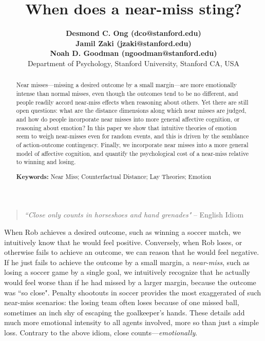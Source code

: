 \documentclass[10pt,letterpaper]{article}
\title{ When does a near-miss sting? }
\author{{\large \bf Desmond C. Ong (dco@stanford.edu)} \\
{\large \bf Jamil Zaki (jzaki@stanford.edu)} \\
{\large \bf Noah D. Goodman (ngoodman@stanford.edu)} \\
  Department of Psychology, Stanford University, Stanford CA, USA 
}
\begin{document}
\maketitle

\begin{abstract}
Near misses---missing a desired outcome by a small margin---are more emotionally intense than normal misses, even though the outcomes tend to be no different, and people readily accord near-miss effects when reasoning about others. Yet there are still open questions: what are the distance dimensions along which near misses are judged, and how do people incorporate near misses into more general affective cognition, or reasoning about emotion? In this paper we show that intuitive theories of emotion seem to weigh near-misses even for random events, and this is driven by the semblance of action-outcome contingency. Finally, we incorporate near misses into a more general model of affective cognition, and quantify the psychological cost of a near-miss relative to winning and losing.

\textbf{Keywords:} 
Near Miss; Counterfactual Distance; Lay Theories; Emotion
\end{abstract}


\begin{quote}
\textit{``Close only counts in horseshoes and hand grenades"} 
-- English Idiom
\end{quote}


	When Rob achieves a desired outcome, such as winning a soccer match, we intuitively know that he would feel positive. Conversely, when Rob loses, or otherwise fails to achieve an outcome, we can reason that he would feel negative. If he just fails to achieve the outcome by a small margin, a \textit{near-miss}, such as losing a soccer game by a single goal, we intuitively recognize that he actually would feel worse than if he had missed by a larger margin, because the outcome was ``so close". Penalty shootouts in soccer provides the most exaggerated of such near-miss scenarios: the losing team often loses because of one missed ball, sometimes an inch shy of escaping the goalkeeper's hands. These details add much more emotional intensity to all agents involved, more so than just a simple loss. Contrary to the above idiom, close counts---\textit{emotionally}.

%
	
\end{document}
